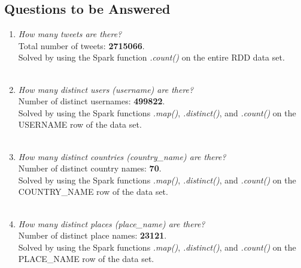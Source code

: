\documentclass{article}
\begin{document}
\subsection*{Questions to be Answered}
\begin{enumerate}[label=\alph*)]
    \item \textit{How many tweets are there?}\\
    
    Total number of tweets: \textbf{2715066}.\\
    
    Solved by using the Spark function \textit{.count()} on the entire RDD data set.\\ \\
    
    
    \item \textit{How many distinct users (username) are there?}\\
    
    Number of distinct usernames: \textbf{499822}.\\
    
    Solved by using the Spark functions \textit{.map()}, \textit{.distinct()}, and \textit{.count()} on the USERNAME row of the data set.\\ \\
    
    
    \item \textit{How many distinct countries (country\_name) are there?}\\
    
    Number of distinct country names: \textbf{70}.\\
    
    Solved by using the Spark functions \textit{.map()}, \textit{.distinct()}, and \textit{.count()} on the COUNTRY\_NAME row of the data set.\\ \\
    
    
    \item \textit{How many distinct places (place\_name) are there?}\\
    
    Number of distinct place names: \textbf{23121}.\\
    
    Solved by using the Spark functions \textit{.map()}, \textit{.distinct()}, and \textit{.count()} on the PLACE\_NAME row of the data set.\\ \\
    

\end{enumerate}
\end{document}
